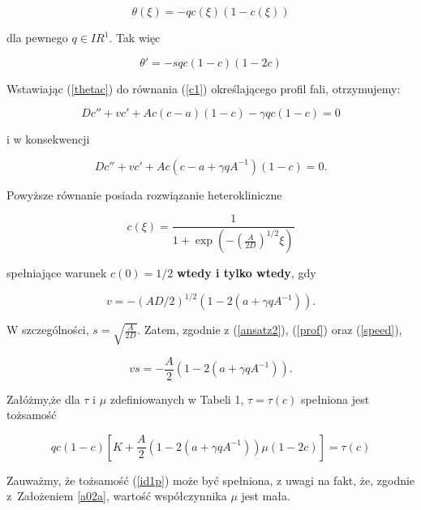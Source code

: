 \begin{equation} \label{thetac}  
\theta(\xi) = - q c(\xi)(1-c(\xi)) 
\end{equation} 

\noindent dla pewnego  $q \in IR^1$. Tak więc

\begin{equation} \label{thetaprim}  
\theta' = -s q c(1-c)(1-2c)  
\end{equation}

\noindent Wstawiając (\ref{thetac}) do równania (\ref{c1}) określającego profil fali, otrzymujemy:

\[ D c'' + v c' + Ac(c-a)(1-c) - \gamma q c (1-c) = 0 \]

\noindent i w konsekwencji

\[ D c'' + v c' + Ac(c-a + \gamma q A^{-1} )(1-c) = 0. \]

\noindent Powyższe równanie posiada rozwiązanie heterokliniczne 

\begin{equation} \label{prof} 
c(\xi) = \frac{1}{1+\exp( -(\frac{A}{2D})^{1/2} \xi)} 
\end{equation} 

\noindent spełniające warunek $c(0)=1/2$ \textbf{wtedy i tylko wtedy}, gdy  

\begin{equation} \label{speed} v = - (AD/2)^{1/2}\left( 1 - 2 (a + \gamma q A^{-1}) \right). \end{equation}

\noindent W szczególności, 
$\displaystyle{s= \sqrt{\frac{A}{2D}}}$. 
Zatem, zgodnie z (\ref{ansatz2}), (\ref{prof}) oraz (\ref{speed}), 

\begin{equation} \label{vs} 
vs= - \frac {A}{2}\left( 1 - 2 (a + \gamma q A^{-1}) \right). 
\end{equation} 

\begin{assum} \label{a02a} Załóżmy,że dla $\tau$ i $\mu$ zdefiniowanych w Tabeli 1, $\tau=\tau(c)$ spełniona jest tożsamość 
		
	\begin{equation} \label{id1p} 
	q c (1-c)\left[ K +  \frac A 2 \left( 1 - 2 (a + \gamma q A^{-1}) \right)  \mu (1-2c) \right] = \tau(c)   
	\end{equation} 
\end{assum} 

\noindent Zauważmy, że tożsamość (\ref{id1p}) może być spełniona, z uwagi na fakt, że, zgodnie z~Założeniem \ref{a02a}, wartość współczynnika $\mu$ jest mała. 

